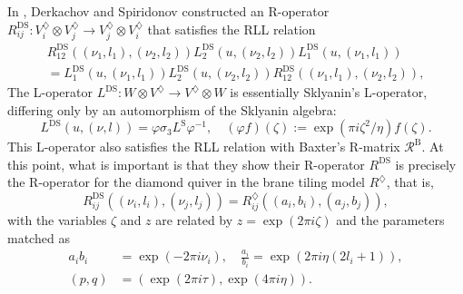 In \cite{Derkachov:2012iv}, Derkachov and Spiridonov constructed
an R-operator $R_{ij}^{\mathrm{DS}}:V_{i}^{\diamondsuit}\otimes V_{j}^{\diamondsuit}\rightarrow V_{j}^{\diamondsuit}\otimes V_{i}^{\diamondsuit}$
that satisfies the RLL relation
\begin{multline}
    R_{12}^{\mathrm{DS}}\left(\left(\nu_{1},l_{1}\right),\left(\nu_{2},l_{2}\right)\right)
    L_{2}^{\mathrm{DS}}\left(u,\left(\nu_{2},l_{2}\right)\right)
    L_{1}^{\mathrm{DS}}\left(u,\left(\nu_{1},l_{1}\right)\right)    \\
      =
        L_{1}^{\mathrm{DS}}\left(u,\left(\nu_{1},l_{1}\right)\right)
        L_{2}^{\mathrm{DS}}\left(u,\left(\nu_{2},l_{2}\right)\right)
        R_{12}^{\mathrm{DS}}\left(\left(\nu_{1},l_{1}\right),\left(\nu_{2},l_{2}\right)\right),
\end{multline}
 The L-operator $L^{\mathrm{DS}}:W\otimes V^{\diamondsuit}\rightarrow V^{\diamondsuit}\otimes W$
is essentially Sklyanin's L-operator, differing only by an automorphism
of the Sklyanin algebra:
\begin{equation}
    L^{\mathrm{DS}}\left(u,\left(\nu,l\right)\right)
      =  \varphi  \sigma_{3}  L^{\mathrm{S}}\varphi^{-1},
        \quad  \left(\varphi f\right)(\zeta)  :=  \exp(\pi i\zeta^{2}/\eta)f(\zeta).
\end{equation}
This L-operator also satisfies the RLL relation with Baxter's R-matrix
$\mathcal{R}^{\mathrm{B}}$. At this point, what is important is that
they show their R-operator $R^{\mathrm{DS}}$ is precisely the R-operator
for the diamond quiver in the brane tiling model $R^{\diamondsuit}$,
that is,
\begin{equation}
    R_{ij}^{\mathrm{DS}}\left(\left(\nu_{i},l_{i}\right),\left(\nu_{j},l_{j}\right)\right)
      =
        R_{ij}^{\diamondsuit}\left(\left(a_{i},b_{i}\right),\left(a_{j},b_{j}\right)\right),
\end{equation}
 with the variables $\zeta$ and $z$ are related by $z=\exp(2\pi i\zeta)$
and the parameters matched as
\begin{align}
    a_{i} b_{i}         &  =  \exp(-2\pi i\nu_{i}),  \quad  \frac{a_{i}}{b_{i}}  =  \exp(2\pi i\eta(2l_{i}+1)),  \\
\left( p,q \right) &  =  \left(\exp(2\pi i\tau),\exp(4\pi i\eta)\right).
\end{align}

